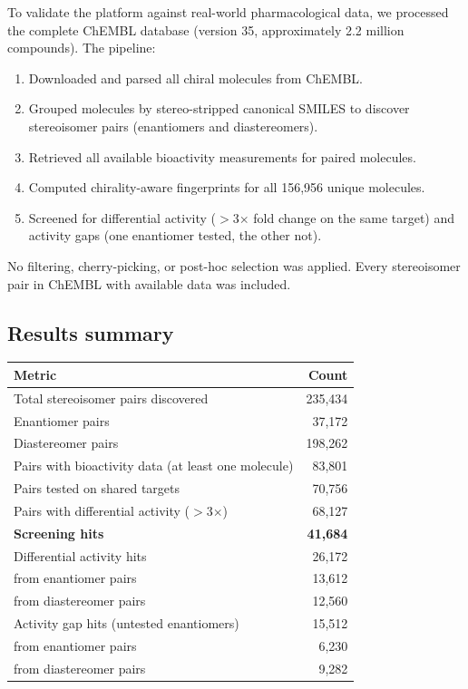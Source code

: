 \documentclass[11pt,a4paper]{article}
\begin{document}
To validate the platform against real-world pharmacological data, we processed
the complete ChEMBL database (version 35, approximately 2.2 million compounds).
The pipeline:

\begin{enumerate}[leftmargin=1.5em]
  \item Downloaded and parsed all chiral molecules from ChEMBL.
  \item Grouped molecules by stereo-stripped canonical SMILES to discover
    stereoisomer pairs (enantiomers and diastereomers).
  \item Retrieved all available bioactivity measurements for paired molecules.
  \item Computed chirality-aware fingerprints for all 156,956 unique molecules.
  \item Screened for differential activity ($>$3$\times$ fold change on the same
    target) and activity gaps (one enantiomer tested, the other not).
\end{enumerate}

No filtering, cherry-picking, or post-hoc selection was applied. Every
stereoisomer pair in ChEMBL with available data was included.

\subsection{Results summary}

\begin{center}
\begin{tabular}{lr}
\toprule
\textbf{Metric} & \textbf{Count} \\
\midrule
Total stereoisomer pairs discovered & 235,434 \\
\quad Enantiomer pairs & 37,172 \\
\quad Diastereomer pairs & 198,262 \\
Pairs with bioactivity data (at least one molecule) & 83,801 \\
Pairs tested on shared targets & 70,756 \\
Pairs with differential activity ($>$3$\times$) & 68,127 \\
\midrule
\textbf{Screening hits} & \textbf{41,684} \\
\quad Differential activity hits & 26,172 \\
\quad\quad from enantiomer pairs & 13,612 \\
\quad\quad from diastereomer pairs & 12,560 \\
\quad Activity gap hits (untested enantiomers) & 15,512 \\
\quad\quad from enantiomer pairs & 6,230 \\
\quad\quad from diastereomer pairs & 9,282 \\
\bottomrule
\end{tabular}
\end{center}
\end{document}
